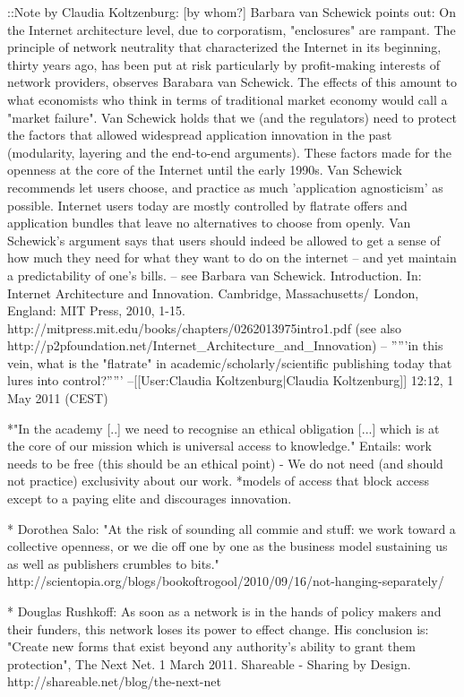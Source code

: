 ::Note by Claudia Koltzenburg:  [by whom?] Barbara van Schewick points out: On the Internet architecture level, due to corporatism, "enclosures" are rampant. The principle of network neutrality that characterized the Internet in its beginning, thirty years ago, has been put at risk particularly by profit-making interests of network providers, observes Barabara van Schewick. The effects of this amount to what economists who think in terms of traditional market economy would call a "market failure". Van Schewick holds that we (and the regulators) need to protect the factors that allowed widespread application innovation in the past (modularity, layering and the end-to-end arguments). These factors made for the openness at the core of the Internet until the early 1990s. Van Schewick recommends let users choose, and practice as much 'application agnosticism' as possible. Internet users today are mostly controlled by flatrate offers and application bundles that leave no alternatives to choose from openly. Van Schewick's argument says that users should indeed be allowed to get a sense of how much they need for what they want to do on the internet – and yet maintain a predictability of one's bills. -- see Barbara van Schewick. Introduction. In: Internet Architecture and Innovation. Cambridge, Massachusetts/ London, England: MIT Press, 2010, 1-15. http://mitpress.mit.edu/books/chapters/0262013975intro1.pdf (see also http://p2pfoundation.net/Internet_Architecture_and_Innovation) -- '''''in this vein, what is the "flatrate" in academic/scholarly/scientific publishing today that lures into control?''''' --[[User:Claudia Koltzenburg|Claudia Koltzenburg]] 12:12, 1 May 2011 (CEST)

*"In the academy [..] we need to recognise an ethical obligation [...] which is at the core of our mission which is universal access to knowledge." Entails: work needs to be free (this should be an ethical point) - We do not need (and should not practice) exclusivity about our work. 
*models of access that block access except to a paying elite and discourages innovation.

* Dorothea Salo: "At the risk of sounding all commie and stuff: we work toward a collective openness, or we die off one by one as the business model sustaining us as well as publishers crumbles to bits." http://scientopia.org/blogs/bookoftrogool/2010/09/16/not-hanging-separately/

* Douglas Rushkoff: As soon as a network is in the hands of policy makers and their funders, this network loses its power to effect change. His conclusion is: "Create new forms that exist beyond any authority's ability to grant them protection", The Next Net. 1 March 2011. Shareable - Sharing by Design. http://shareable.net/blog/the-next-net

